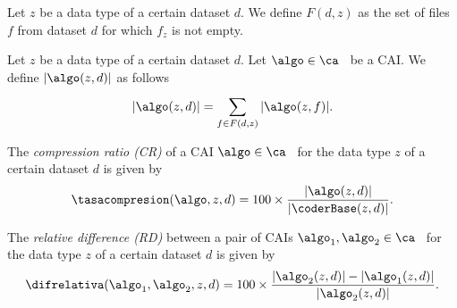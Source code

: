 \vspace{+5pt}
\begin{defcion}
Let $z$ be a data type of a certain dataset $d$. We define $F(d, z)$ as the set of files $f$ from dataset $d$ for which $f_z$ is not empty.
\end{defcion}


\begin{defcion}
Let $z$ be a data type of a certain dataset $d$. Let $\algo \in \ca$ \ be a CAI. We define $|\algo(z, d)|$ as follows
\vspace{-5pt}
\begin{equation}
\label{eq:dataset-size}
|\algo(z, d)|  = \sum_{f \in F(d, z)}^{} |\algo(z, f)|.
\end{equation}
\end{defcion}


\vspace{+3pt}
\begin{defcion}
The \textit{compression ratio (CR)} of a CAI $\algo \in \ca$ \ for the data type $z$ of a certain dataset $d$ is given by
\vspace{-5pt}
\begin{equation}
\label{eq:compression-rate-dataset}
\tasacompresion(\algo, z, d) = 100\times\frac{|\algo(z, d)|}{|\coderBase(z, d)|}.
\end{equation}
\end{defcion}


\vspace{+3pt}
\begin{defcion}
The \textit{relative difference (RD)} between a pair of CAIs $\algo_1, \algo_2 \in {\ca}$ \ for the data type $z$ of a certain dataset $d$ is given by
\vspace{-5pt}
\begin{equation}
\label{eq:relative-difference-dataset}
\difrelativa(\algo_1, \algo_2, z, d)  =
100\times\frac{|\algo_2 (z, d)| - |\algo_1 (z, d)|}{ |\algo_2 (z, d)| }.
\end{equation}
\end{defcion}


\clearpage